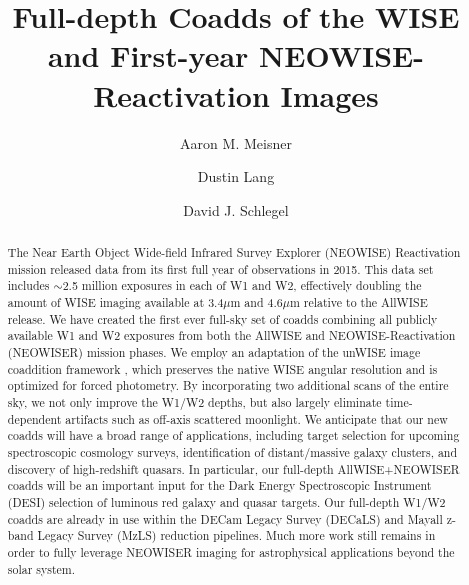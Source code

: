 \documentclass{emulateapj}
\begin{document}
 
\title{Full-depth Coadds of the WISE and First-year NEOWISE-Reactivation Images}

\author{Aaron M. Meisner}
\author{Dustin Lang}
\author{David J. Schlegel}


\begin{abstract} 
The Near Earth Object Wide-field Infrared Survey Explorer (NEOWISE)
Reactivation mission released data from its first full year of observations
in 2015. This data set includes $\sim$2.5 million exposures in each of W1 and
W2, effectively doubling the amount of WISE imaging available at 3.4$\mu$m and 
4.6$\mu$m relative to the AllWISE release. We have created the first ever 
full-sky set of coadds combining all publicly available W1 and W2 exposures 
from both the AllWISE and NEOWISE-Reactivation (NEOWISER) mission phases. We 
employ an adaptation of the unWISE image coaddition framework \citep{lang14}, 
which preserves the native WISE angular resolution and is optimized for forced 
photometry. By incorporating two additional scans of the entire sky, we not 
only improve the W1/W2 depths, but also largely eliminate time-dependent 
artifacts such as off-axis scattered moonlight. We anticipate that our new 
coadds will have a broad range of applications, including target selection for 
upcoming spectroscopic cosmology surveys, identification of distant/massive 
galaxy clusters, and discovery of high-redshift quasars. In particular, our 
full-depth AllWISE+NEOWISER coadds will be an important input for the Dark 
Energy Spectroscopic Instrument (DESI) selection of luminous red galaxy and 
quasar targets. Our full-depth W1/W2 coadds are already in use within the 
DECam Legacy Survey (DECaLS) and Mayall z-band Legacy Survey (MzLS) reduction 
pipelines. Much more work still remains in order to fully leverage NEOWISER 
imaging for astrophysical applications beyond the solar system.
\end{abstract}  
 
\end{document}
